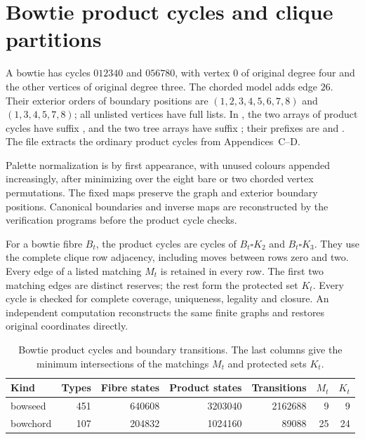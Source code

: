 \clearpage
\section{Bowtie product cycles and clique partitions}
\label{app:bowtie-constructions}
A bowtie has cycles $012340$ and $056780$, with vertex $0$ of
original degree four and the other vertices of original degree three.
The chorded model adds edge $26$. Their exterior orders of boundary positions are
$(1,2,3,4,5,6,7,8)$ and $(1,3,4,5,7,8)$; all unlisted vertices
have full lists. In , the two arrays of product cycles have
suffix , and the two tree arrays have suffix
; their prefixes are  and
. The file 
extracts the ordinary product cycles from
Appendices~C--D.

Palette normalization is by first appearance, with unused colours
appended increasingly, after minimizing over the eight bare or two
chorded vertex permutations. The fixed maps preserve the graph and exterior
boundary positions. Canonical boundaries and inverse maps are reconstructed by the
verification programs before the product cycle checks.

For a bowtie fibre $B_t$, the product cycles are cycles of
$B_t\square K_2$ and $B_t\square K_3$. They use the complete clique
row adjacency, including moves between rows zero and two. Every edge
of a listed matching $M_t$ is retained in every row.
The first two matching edges are distinct reserves; the rest form
the protected set $K_t$. Every cycle is checked for complete coverage,
uniqueness, legality and closure. An independent computation reconstructs the
same finite graphs and restores original coordinates directly.

\begin{table}[htbp]
\centering\small
\caption{Bowtie product cycles and boundary transitions. The last columns give
the minimum intersections of the matchings $M_t$ and protected sets $K_t$.}
\label{tab:bowtie-counts}
\begin{tabular}{lrrrrrr}
\toprule
Kind & Types & Fibre states & Product states & Transitions & $M_t$ & $K_t$\\
\midrule
bowseed&451&640608&3203040&2162688&9&9\\
bowchord&107&204832&1024160&89088&25&24\\
\bottomrule
\end{tabular}
\end{table}

